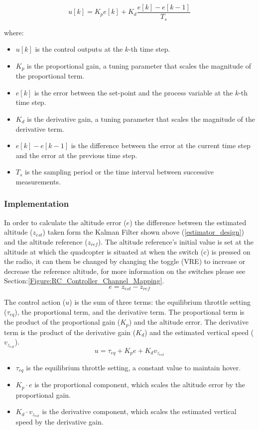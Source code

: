 \documentclass{report}
\begin{document}
\begin{equation}
  u[k] = K_p e[k] + K_d \frac{e[k] - e[k-1]}{T_s}
\end{equation}

where:
\begin{itemize}
  \item $u[k]$ is the control output\(u\) at the $k$-th time step.
  \item $K_p$ is the proportional gain, a tuning parameter that scales the
  magnitude of the proportional term.
  \item $e[k]$ is the error between the set-point and the process variable at the $k$-th time step.
  \item $K_d$ is the derivative gain, a tuning parameter that scales the
  magnitude of the derivative term.
  \item $e[k] - e[k-1]$ is the difference between the error at the current time step and the error at the previous time step.
  \item  $T_s$ is the sampling period or the time interval between successive measurements.
\end{itemize}

\subsubsection*{Implementation}
In order to calculate the altitude error (\(e\)) the difference between the
estimated altitude (\(z_{est}\)) taken form the Kalman Filter shown above
(\ref{estimator_design}) and the altitude reference (\(z_{ref}\)). The altitude
reference's initial value is set at the altitude at which the quadcopter is situated at
when the switch (c) is pressed on the radio, it can them be changed by changing
the toggle (VRE) to increase or decrease the reference altitude, for more information on the switches please see Section:\ref{Figure:RC_Controller_Channel_Mapping}.
\begin{equation}
  e = z_{est} - z_{ref}
\end{equation}

The control action (\(u\)) is the sum of three terms: the equilibrium throttle
setting (\(\tau_{eq}\)), the proportional term, and the derivative term. The
proportional term is the product of the proportional gain (\(K_p\)) and the
altitude error. The derivative term is the product of the derivative gain
(\(K_d\)) and the estimated vertical speed (\(v_{z_{est}}\)).
\begin{equation}\label{PD_controller_eq}
  u = \tau_{eq} + K_p e + K_d v_{z_{est}}
\end{equation}
\begin{itemize}
  \item \(\tau_{eq}\) is the equilibrium throttle setting, a constant value to
  maintain hover.
  \item \(K_p \cdot e\) is the proportional component, which scales the altitude
  error by the proportional gain.
  \item \(K_d \cdot v_{z_{est}}\) is the derivative component, which scales the
  estimated vertical speed by the derivative gain.
\end{itemize}
\end{document}
